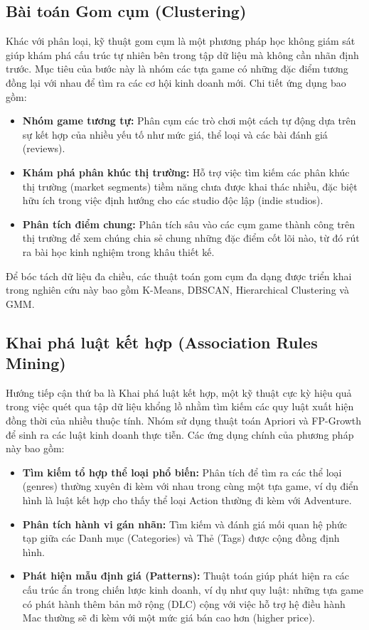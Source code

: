 \subsection{Bài toán Gom cụm (Clustering)}
\hspace{1cm} Khác với phân loại, kỹ thuật gom cụm là một phương pháp học không giám sát giúp khám phá cấu trúc tự nhiên bên trong tập dữ liệu mà không cần nhãn định trước. Mục tiêu của bước này là nhóm các tựa game có những đặc điểm tương đồng lại với nhau để tìm ra các cơ hội kinh doanh mới. Chi tiết ứng dụng bao gồm:
\begin{itemize}
    \item \textbf{Nhóm game tương tự:} Phân cụm các trò chơi một cách tự động dựa trên sự kết hợp của nhiều yếu tố như mức giá, thể loại và các bài đánh giá (reviews).
    \item \textbf{Khám phá phân khúc thị trường:} Hỗ trợ việc tìm kiếm các phân khúc thị trường (market segments) tiềm năng chưa được khai thác nhiều, đặc biệt hữu ích trong việc định hướng cho các studio độc lập (indie studios).
    \item \textbf{Phân tích điểm chung:} Phân tích sâu vào các cụm game thành công trên thị trường để xem chúng chia sẻ chung những đặc điểm cốt lõi nào, từ đó rút ra bài học kinh nghiệm trong khâu thiết kế.
\end{itemize}
\hspace{1cm} Để bóc tách dữ liệu đa chiều, các thuật toán gom cụm đa dạng được triển khai trong nghiên cứu này bao gồm K-Means, DBSCAN, Hierarchical Clustering và GMM.

\subsection{Khai phá luật kết hợp (Association Rules Mining)}
\hspace{1cm} Hướng tiếp cận thứ ba là Khai phá luật kết hợp, một kỹ thuật cực kỳ hiệu quả trong việc quét qua tập dữ liệu khổng lồ nhằm tìm kiếm các quy luật xuất hiện đồng thời của nhiều thuộc tính. Nhóm sử dụng thuật toán Apriori và FP-Growth để sinh ra các luật kinh doanh thực tiễn. Các ứng dụng chính của phương pháp này bao gồm:
\begin{itemize}
    \item \textbf{Tìm kiếm tổ hợp thể loại phổ biến:} Phân tích để tìm ra các thể loại (genres) thường xuyên đi kèm với nhau trong cùng một tựa game, ví dụ điển hình là luật kết hợp cho thấy thể loại Action thường đi kèm với Adventure.
    \item \textbf{Phân tích hành vi gán nhãn:} Tìm kiếm và đánh giá mối quan hệ phức tạp giữa các Danh mục (Categories) và Thẻ (Tags) được cộng đồng định hình.
    \item \textbf{Phát hiện mẫu định giá (Patterns):} Thuật toán giúp phát hiện ra các cấu trúc ẩn trong chiến lược kinh doanh, ví dụ như quy luật: những tựa game có phát hành thêm bản mở rộng (DLC) cộng với việc hỗ trợ hệ điều hành Mac thường sẽ đi kèm với một mức giá bán cao hơn (higher price).
\end{itemize}






